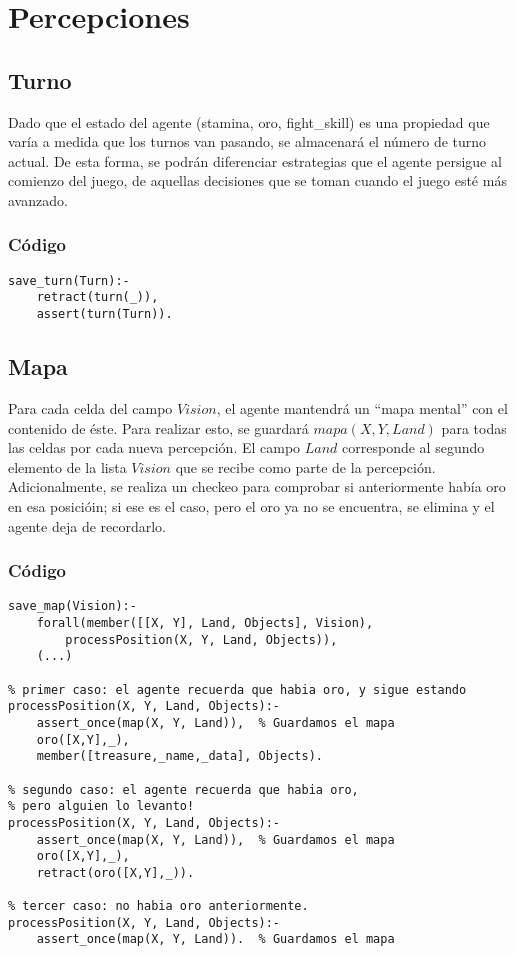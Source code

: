 \documentclass[a4paper,10pt,spanish]{article}
\begin{document}
\section{Percepciones}
	\subsection{Turno}
	
	Dado que el estado del agente (stamina, oro, fight\_skill) es una propiedad que var\'ia a medida que los turnos van pasando, se almacenar\'a el n\'umero de turno actual. De esta forma, se podr\'an diferenciar estrategias que el agente persigue al comienzo del juego, de aquellas decisiones que se toman cuando el juego est\'e m\'as avanzado.
	
		\subsubsection{C\'odigo}
		\begin{lstlisting}
save_turn(Turn):- 
	retract(turn(_)), 
	assert(turn(Turn)).
		\end{lstlisting}

	\subsection{Mapa}
	
	Para cada celda del campo $Vision$, el agente mantendr\'a un ``mapa mental'' con el contenido de \'este. Para realizar esto, se guardar\'a $mapa(X, Y, Land)$ para todas las celdas por cada nueva percepci\'on. El campo $Land$ corresponde al segundo elemento de la lista $Vision$ que se recibe como parte de la percepci\'on. Adicionalmente, se realiza un checkeo para comprobar si anteriormente hab\'ia oro en esa posici\'oin; si ese es el caso, pero el oro ya no se encuentra, se elimina y el agente deja de recordarlo.
	
		\subsubsection{C\'odigo}
		\begin{lstlisting}
save_map(Vision):- 
	forall(member([[X, Y], Land, Objects], Vision),
		processPosition(X, Y, Land, Objects)), 
	(...)

% primer caso: el agente recuerda que habia oro, y sigue estando
processPosition(X, Y, Land, Objects):-
	assert_once(map(X, Y, Land)),  % Guardamos el mapa
	oro([X,Y],_),
	member([treasure,_name,_data], Objects).
	
% segundo caso: el agente recuerda que habia oro,
% pero alguien lo levanto!
processPosition(X, Y, Land, Objects):-
	assert_once(map(X, Y, Land)),  % Guardamos el mapa
	oro([X,Y],_),
	retract(oro([X,Y],_)).

% tercer caso: no habia oro anteriormente.
processPosition(X, Y, Land, Objects):-
	assert_once(map(X, Y, Land)).  % Guardamos el mapa

		\end{lstlisting}
	
\end{document}
